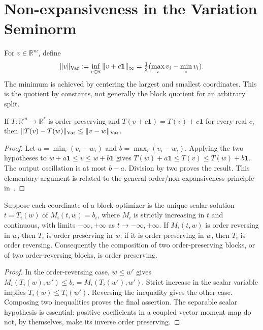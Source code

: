 \section{Non-expansiveness in the Variation Seminorm}\label{app-sec:non-expansiveness}
For $v\in\mathbb R^m$, define
\begin{equation}\label{app-eq:variation-seminorm}
\|v\|_{\rm Var}:=\inf_{c\in\mathbb R}\|v+c\mathbf1\|_\infty
=\tfrac12(\max_i v_i-\min_i v_i).
\end{equation}
The minimum is achieved by centering the largest and smallest coordinates. This is the quotient by constants, not generally the block quotient for an arbitrary split.

\begin{proposition}\label{app-prop:topical-nonexpansive}
If $T:\mathbb R^m\to\mathbb R^\ell$ is order preserving and $T(v+c\mathbf1)=T(v)+c\mathbf1$ for every real $c$, then $\|T(v)-T(w)\|_{\rm Var}\leq\|v-w\|_{\rm Var}$.
\end{proposition}
\begin{proof}
Let $a=\min_i(v_i-w_i)$ and $b=\max_i(v_i-w_i)$. Applying the two hypotheses to $w+a\mathbf1\leq v\leq w+b\mathbf1$ gives $T(w)+a\mathbf1\leq T(v)\leq T(w)+b\mathbf1$. The output oscillation is at most $b-a$. Division by two proves the result. This elementary argument is related to the general order/non-expansiveness principle in~\citep{candrall1980some}.
\end{proof}

\begin{proposition}\label{app-prop:block-monotone}
Suppose each coordinate of a block optimizer is the unique scalar solution $t=T_i(w)$ of $M_i(t,w)=b_i$, where $M_i$ is strictly increasing in $t$ and continuous, with limits $-\infty,+\infty$ as $t\to-\infty,+\infty$. If $M_i(t,w)$ is order reversing in $w$, then $T_i$ is order preserving in $w$; if it is order preserving in $w$, then $T_i$ is order reversing. Consequently the composition of two order-preserving blocks, or of two order-reversing blocks, is order preserving.
\end{proposition}
\begin{proof}
In the order-reversing case, $w\leq w'$ gives $M_i(T_i(w),w')\leq b_i=M_i(T_i(w'),w')$. Strict increase in the scalar variable implies $T_i(w)\leq T_i(w')$. Reversing the inequality gives the other case. Composing two inequalities proves the final assertion. The separable scalar hypothesis is essential: positive coefficients in a coupled vector moment map do not, by themselves, make its inverse order preserving.
\end{proof}


